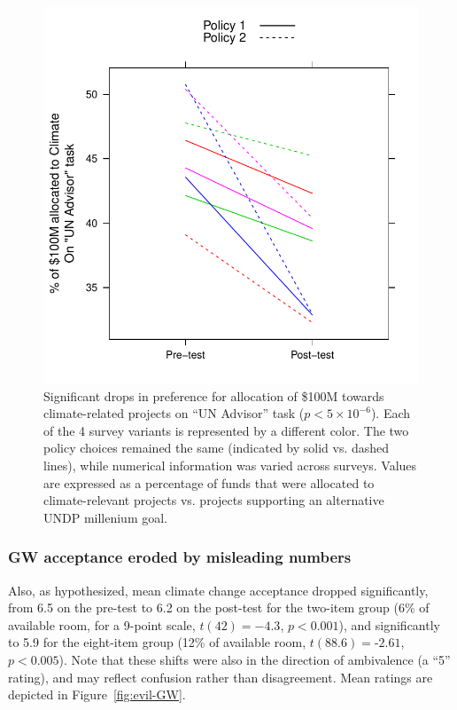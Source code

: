 \begin{figure}
    \centering
    \includegraphics{evil-alloc.pdf}
    \caption{Significant drops in preference for allocation of \$100M towards
        climate-related projects on “UN Advisor” task ($p<5\times10^{-6}$). Each
        of the 4 survey variants is represented by a different color. The two
        policy choices remained the same (indicated by solid vs. dashed lines),
        while numerical information was varied across surveys. Values are
        expressed as a percentage of funds that were allocated to
        climate-relevant projects vs. projects supporting an alternative UNDP
        millenium goal.}
    \label{fig:evil-alloc}
\end{figure}

\subsubsection{GW acceptance eroded by misleading numbers}

Also, as hypothesized, mean climate change acceptance dropped significantly,
from 6.5 on the pre-test to 6.2 on the post-test for the two-item group (6\% of
available room, for a 9-point scale, $t(42)=-4.3$, $p<0.001$), and significantly to
5.9 for the eight-item group (12\% of available room, $t(88.6)=‑2.61$, $p<0.005$).
Note that these shifts were also in the direction of ambivalence (a ``5''
rating), and may reflect confusion rather than disagreement. Mean ratings are
depicted in Figure~\ref{fig:evil-GW}.

